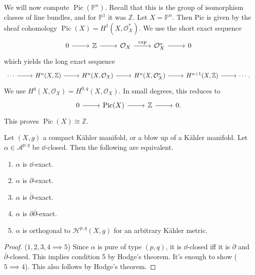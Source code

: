 
We will now compute $\operatorname{Pic} (\mathbb{P}^n)$. Recall that this is the group of isomorphism classes of line bundles, and for $\mathbb{P} ^1$ it was $\mathbb{Z} $. Let $X=\mathbb{P} ^n$. Then Pic is given by the sheaf cohomology $\operatorname{Pic} (X) = H^1(X,\mathcal{O} _X^*)$. We use the short exact sequence
\[\begin{tikzcd}[row sep = 2.5em, column sep = 2.5em]
0\ar[r]  & \mathbb{Z} \ar[r]  & \mathcal{O} _X\ar[" \exp  ", r]  & \mathcal{O} _X^*\ar[r]  & 0
\end{tikzcd}\]
which yields the long exact sequence
\[\begin{tikzcd}[row sep = 2.5em, column sep = 2.5em]
	\cdots \ar[r]  & H^n(X,\mathbb{Z} )\ar[r]  & H^n(X,\mathcal{O} _X)\ar[r]  & H^n(X,\mathcal{O} _X^*)\ar[r]  & H^{n+1} (X,\mathbb{Z} )\ar[r]  & \cdots .
\end{tikzcd}\]
We use $H^q(X,\mathcal{O} _X) = H^{0,q} (X,\mathcal{O} _X)$. In small degrees, this reduces to
\[\begin{tikzcd}[row sep = 2.5em, column sep = 2.5em]
0\ar[r]  & \operatorname{Pic} (X)\ar[r]  & \mathbb{Z} \ar[r]  & 0.
\end{tikzcd}\]
This proves $\operatorname{Pic} (X)\cong \mathbb{Z} $.

\begin{lemma}[$\partial\overline{\partial }$]\label{lma:owo}
	Let $(X,g)$ a compact K\"ahler manifold, or a blow up of a K\"ahler manifold. Let $\alpha \in \mathcal{A} ^{p,q} $ be $\dd $-closed. Then the following are equivalent.
	\begin{enumerate}
		\item $\alpha $ is $\dd $-exact.
		\item $\alpha $ is $\partial $-exact.
		\item $\alpha $ is $\overline{\partial } $-exact.
		\item $\alpha $ is $\partial \overline{\partial } $-exact.
		\item $\alpha $ is orthogonal to $\mathcal{H} ^{p,q}(X,g)$ for an arbitrary K\"ahler metric.
	\end{enumerate}
\end{lemma}
\begin{proof} 
	($1,2,3,4\implies 5$) Since $\alpha $ is pure of type $(p,q)$, it is $\dd $-closed iff it is $\partial $ and $\overline{\partial } $-closed. This implies condition 5 by Hodge's theorem. It's enough to show ($5\implies 4$). This also follows by Hodge's theorem.
\end{proof}

